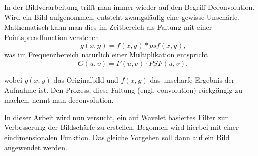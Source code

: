 In der Bildverarbeitung trifft man immer wieder auf den Begriff Deconvolution.
Wird ein Bild aufgenommen, entsteht zwangsläufig eine gewisse Unschärfe.
Mathematisch kann man dies im Zeitbereich als Faltung mit einer Pointspreadfunction \cite{buch:image_processing} verstehen
$$g(x,y) = f(x,y)*psf(x,y),$$
was im Frequenzbereich natürlich einer Multiplikation entspricht
$$G(u,v)=F(u,v)\cdot PSF(u,v),$$

wobei $g(x,y)$ das Originalbild und $f(x,y)$ das unscharfe Ergebnis der Aufnahme ist.
Den Prozess, diese Faltung (engl. convolution) rückgängig zu machen, nennt man deconvolution.

In dieser Arbeit wird nun versucht, ein auf Wavelet basiertes Filter zur Verbesserung der Bildschärfe zu erstellen. Begonnen wird hierbei mit einer eindimensionalen Funktion. Das gleiche Vorgehen soll dann auf ein Bild angewendet werden.